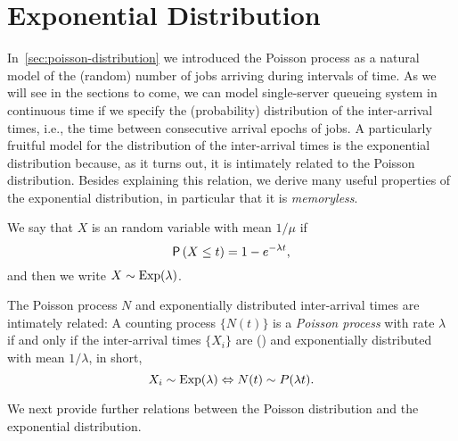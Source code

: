 \section{Exponential Distribution}
\label{sec:expon-distr}




In~\cref{sec:poisson-distribution} we introduced the Poisson process as a natural model of the (random) number of jobs arriving during intervals of time.
As we will see in the sections to come, we can model single-server queueing system in continuous time if we specify the (probability) distribution of the inter-arrival times, i.e., the time between consecutive arrival epochs of jobs.
A particularly fruitful model for the distribution of the inter-arrival times is the exponential distribution because, as it turns out, it is intimately related to the Poisson distribution.
Besides explaining this relation, we derive many useful properties of the exponential distribution, in particular that it is \emph{memoryless}.

We say that $X$ is an  random variable with mean $1/\mu$ if 
\begin{equation*}
  \P{X \leq t} = 1- e^{-\lambda t},
\end{equation*}
and then  we write $X\sim \operatorname{Exp}(\lambda)$.


The Poisson process $N$ and exponentially distributed inter-arrival times are intimately related: A counting process $\{N(t)\}$ is a \emph{Poisson process} with rate $\lambda$ if and only if  the inter-arrival times $\{X_i\}$ are  () and exponentially distributed with mean $1/\lambda$,  in short, 
\begin{equation*}
X_i\sim \operatorname{Exp}(\lambda) \Leftrightarrow N(t) \sim P(\lambda t).
\end{equation*}


We next provide further relations between the Poisson distribution and the exponential distribution. 


